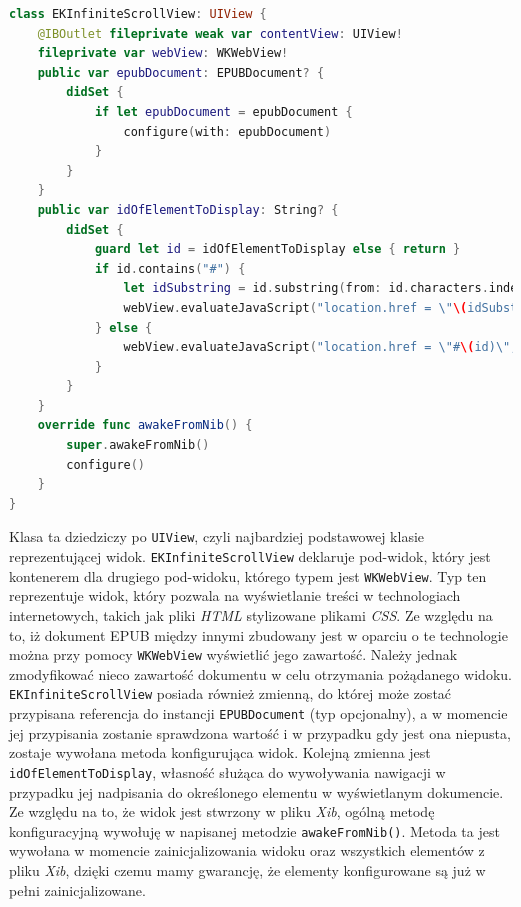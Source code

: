 \begin{lstlisting}[language=swift,caption={Deklaracja klasy \texttt{EKInfiniteScrollView}}, label=EKInfiniteScrollView-declaration]
class EKInfiniteScrollView: UIView {
    @IBOutlet fileprivate weak var contentView: UIView!
    fileprivate var webView: WKWebView!
    public var epubDocument: EPUBDocument? {
        didSet {
            if let epubDocument = epubDocument {
                configure(with: epubDocument)
            }
        }
    }
    public var idOfElementToDisplay: String? {
        didSet {
            guard let id = idOfElementToDisplay else { return }
            if id.contains("#") {
                let idSubstring = id.substring(from: id.characters.index(of: "#")!)
                webView.evaluateJavaScript("location.href = \"\(idSubstring)\";")
            } else {
                webView.evaluateJavaScript("location.href = \"#\(id)\";")
            }
        }
    }
    override func awakeFromNib() {
        super.awakeFromNib()
        configure()
    }
}
\end{lstlisting}

Klasa ta dziedziczy po \texttt{UIView}, czyli najbardziej podstawowej klasie reprezentującej widok. \texttt{EKInfiniteScrollView} deklaruje pod-widok, który jest kontenerem dla drugiego pod-widoku, którego typem jest \texttt{WKWebView}. Typ ten reprezentuje widok, który pozwala na wyświetlanie treści w technologiach internetowych, takich jak pliki \textit{HTML} stylizowane plikami \textit{CSS}. Ze względu na to, iż dokument EPUB między innymi zbudowany jest w oparciu o te technologie można przy pomocy \texttt{WKWebView} wyświetlić jego zawartość. Należy jednak zmodyfikować nieco zawartość dokumentu w celu otrzymania pożądanego widoku. \texttt{EKInfiniteScrollView} posiada również zmienną, do której może zostać przypisana referencja do instancji \texttt{EPUBDocument} (typ opcjonalny), a w momencie jej przypisania zostanie sprawdzona wartość i w przypadku gdy jest ona niepusta, zostaje wywołana metoda konfigurująca widok. Kolejną zmienna jest \texttt{idOfElementToDisplay}, własność służąca do wywoływania nawigacji w przypadku jej nadpisania do określonego elementu w wyświetlanym dokumencie. Ze względu na to, że widok jest stwrzony w pliku \textit{Xib}, ogólną metodę konfiguracyjną wywołuję w napisanej metodzie \texttt{awakeFromNib()}. Metoda ta jest wywołana w momencie zainicjalizowania widoku oraz wszystkich elementów z pliku \textit{Xib}, dzięki czemu mamy gwarancję, że elementy konfigurowane są już w pełni zainicjalizowane.


